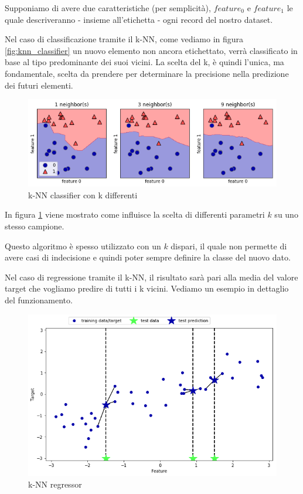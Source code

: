 \documentclass[12pt,italian]{report}
\begin{document}
Supponiamo di avere due caratteristiche (per semplicità), $ feature_{0} $ e $ feature_{1} $ le quale descriveranno - insieme all'etichetta - ogni record del nostro dataset. 

Nel caso di classificazione tramite il k-NN, come vediamo in figura \ref{fig:knn_classifier} un nuovo elemento non ancora etichettato, verrà classificato in base al tipo predominante dei suoi vicini. La scelta del k, è quindi l'unica, ma fondamentale, scelta da prendere per determinare la precisione nella predizione dei futuri elementi.


\vspace{5 mm}
\begin{figure}[h!]
	\center
	\includegraphics[scale=0.55]{../img/knn_comparison}
	\caption{k-NN classifier con k differenti}
	\label{fig:knn_difference}
\end{figure}


In figura \ref{fig:knn_difference} viene mostrato come influisce la scelta di differenti parametri $ k $ su uno stesso campione.

Questo algoritmo è spesso utilizzato con un $ k $ dispari, il quale non permette di avere casi di indecisione e quindi poter sempre definire la classe del nuovo dato.

Nel caso di regressione tramite il k-NN, il risultato sarà pari alla media del valore target che vogliamo predire di tutti i k vicini. Vediamo un esempio in dettaglio del funzionamento.

\begin{figure}[h!]
	\center
	\includegraphics[scale=0.6]{../img/knn_regressor}
	\caption{k-NN regressor}
	\label{fig:knn_regressor}
\end{figure}
\end{document}
